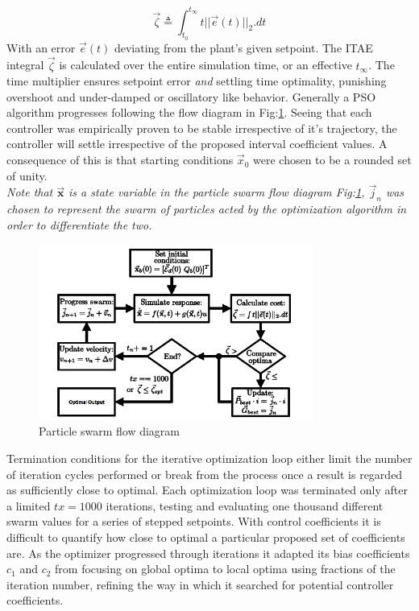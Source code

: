 \begin{equation}
\vec{\zeta}\triangleq\int_{t_0}^{t_\infty}t||\vec{e}(t)||_2.dt
\end{equation}
With an error $\vec{e}(t)$ deviating from the plant's given setpoint. The ITAE integral $\vec{\zeta}$ is calculated over the entire simulation time, or an effective $t_\infty$. The time multiplier ensures setpoint error \emph{and} settling time optimality, punishing overshoot and under-damped or oscillatory like behavior. Generally a PSO algorithm progresses following the flow diagram in Fig:\ref{fig:particle-diagram}. Seeing that each controller was empirically proven to be stable irrespective of it's trajectory, the controller will settle irrespective of the proposed interval coefficient values. A consequence of this is that starting conditions $\vec{x}_0$ were chosen to be a rounded set of unity.
\\
\emph{\color{Gray} Note that $\vec{\mathbf{x}}$ is a state variable in the particle swarm flow diagram Fig:\ref{fig:particle-diagram}, $\vec{j}_n$ was chosen to represent the swarm of particles acted by the optimization algorithm in order to differentiate the two.}
\\
\begin{figure}[htbp]
\centering
\includegraphics[width=0.8\textwidth]{figs/particle-diagram}\vspace{-12pt}
\caption{Particle swarm flow diagram}
\label{fig:particle-diagram}
\vspace{-18pt}
\end{figure}
\par
Termination conditions for the iterative optimization loop either limit the number of iteration cycles performed or break from the process once a result is regarded as sufficiently close to optimal. Each optimization loop was terminated only after a limited $tx=1000$ iterations, testing and evaluating one thousand different swarm values for a series of stepped setpoints. With control coefficients it is difficult to quantify how close to optimal a particular proposed set of coefficients are. As the optimizer progressed through iterations it adapted its bias coefficients $c_1$ and $c_2$ from focusing on global optima to local optima using fractions of the iteration number, refining the way in which it searched for potential controller coefficients.
